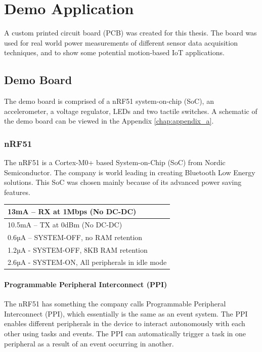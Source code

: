\chapter{Demo Application}

A custom printed circuit board (PCB) was created for this thesis. The board was used for real world power measurements of different sensor data acquisition techniques, and to show some potential motion-based IoT applications. 

\section{Demo Board}

The demo board is comprised of a nRF51 system-on-chip (SoC), an accelerometer, a voltage regulator, LEDs and two tactile switches. 
A schematic of the demo board can be viewed in the Appendix \ref{chap:appendix_a}. 

\subsection{nRF51}

The nRF51 is a Cortex-M0+ based System-on-Chip (SoC) from Nordic Semiconductor. The company is world leading in creating Bluetooth Low Energy solutions. This SoC was chosen mainly because of its advanced power saving features. 

\begin{center}
    \begin{tabular}{| l |}
    \hline
    13mA – RX at 1Mbps (No DC-DC) \\ \hline
    10.5mA – TX at 0dBm (No DC-DC) \\ \hline
    0.6µA – SYSTEM-OFF, no RAM retention \\ \hline
    1.2µA - SYSTEM-OFF, 8KB RAM retention \\ \hline
    2.6µA - SYSTEM-ON, All peripherals in idle mode \\ \hline
    \end{tabular}
\end{center}

\subsubsection{Programmable Peripheral Interconnect (PPI)}

The nRF51 has something the company calls Programmable Peripheral Interconnect (PPI), which essentially is the same as an event system. The PPI enables different peripherals in the device to interact autonomously with each other using tasks and events. The PPI can automatically trigger a task in one peripheral as a result of an event occurring in another. 

